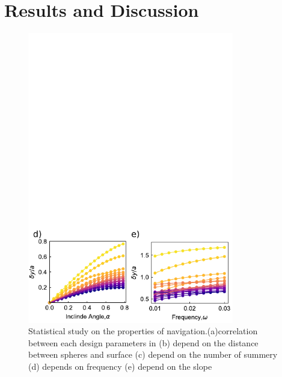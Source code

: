  \section{Results and Discussion}
 \begin{figure}[p]
\centering
\includegraphics[width=9cm]{figures/5_4.pdf}
\caption{ Statistical study on the properties of navigation.(a)correlation between each design parameters in   (b) depend on the distance between spheres and surface (c) depend on the number of summery (d) depends on frequency (e) depend on the slope}
\label{fig:1}
\end{figure}
